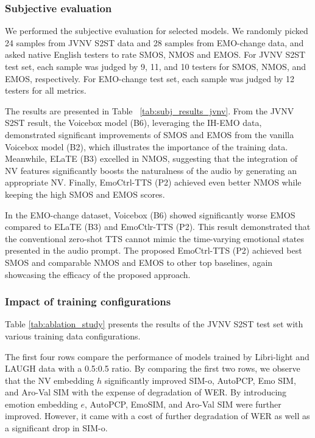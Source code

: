 \vspace{-.5em}
\subsubsection{Subjective evaluation}
\vspace{-.5em}

We performed the subjective evaluation for selected models.
We randomly picked 24 samples from JVNV S2ST data and 28 samples from EMO-change data, and asked native English testers to rate SMOS, NMOS and EMOS.
For JVNV S2ST test set, each sample was judged by 9, 11, and 10 testers for SMOS, NMOS, and EMOS, respectively. For EMO-change test set, each sample was judged by 12 testers for all metrics. 

The results are presented in Table ~\ref{tab:subj_results_jvnv}. 
From the JVNV S2ST result, the Voicebox model (B6), leveraging the IH-EMO data, demonstrated significant improvements of SMOS and EMOS from the vanilla Voicebox model (B2), which illustrates the importance of the training data. Meanwhile, ELaTE (B3) excelled in NMOS, suggesting that the integration of NV features significantly boosts the naturalness of the audio by generating an appropriate NV.
Finally, EmoCtrl-TTS (P2) achieved even better NMOS while keeping the high SMOS and EMOS scores.

In the EMO-change dataset, 
Voicebox (B6) showed significantly worse EMOS
compared to ELaTE (B3) and EmoCtlr-TTS (P2).
This result demonstrated that 
the conventional zero-shot TTS 
cannot mimic the time-varying
emotional states presented in the 
audio prompt.
The proposed EmoCtrl-TTS (P2) 
achieved best SMOS and
comparable NMOS and EMOS to other top 
baselines, again showcasing the
efficacy of the proposed approach.

\vspace{-.5em}
\subsubsection{Impact of training configurations}
\label{ssec:train-config}
\vspace{-.5em}

Table \ref{tab:ablation_study} presents the results of the JVNV S2ST test set with various training data configurations. 

The first four rows compare the performance of models trained by Libri-light and LAUGH data with a 0.5:0.5 ratio. By comparing the first two rows, we observe that the NV embedding $h$  significantly improved SIM-o, AutoPCP, Emo SIM, and Aro-Val SIM with the expense of degradation of WER. By introducing emotion embedding $e$, AutoPCP, EmoSIM, and Aro-Val SIM were further improved. However, it came with a cost of further degradation of WER as well as a significant drop in SIM-o.
    
